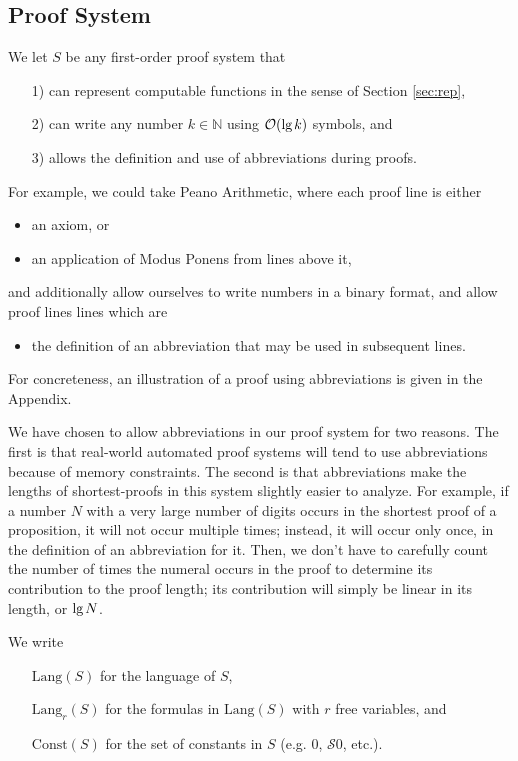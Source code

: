 \documentclass[onecolumn]{miri-tech-article}
\numberwithin{equation}{section}
\theoremstyle{definition}
\newcommand{\NN}{\mathbb{N}}
\newcommand{\Oo}{\mathcal{O}}
\newcommand{\Ss}{\mathcal{S}}
\newcommand{\Lang}{\mathrm{Lang}}
\newcommand{\Const}{\mathrm{Const}}
\renewcommand{\lg}{\mathrm{lg\hspace{0.3ex}}}
\renewcommand{\-}{^{-1}}
\begin{document}
\subsection{Proof System}\label{sec:system}
We let $S$ be any first-order proof system that
\begin{itemize}
\item[1)] can represent computable functions in the sense of Section \ref{sec:rep},
\item[2)] can write any number $k\in\NN$ using $\Oo(\lg k)$ symbols, and 
\item[3)] allows the definition and use of abbreviations during proofs.
\end{itemize}
For example, we could take Peano Arithmetic, where each proof line is either 
\begin{itemize}
\item an axiom, or
\item an application of Modus Ponens from lines above it,
\end{itemize}
and additionally allow ourselves to write numbers in a binary format, and allow proof lines lines which are
\begin{itemize}
\item the definition of an abbreviation that may be used in subsequent lines.
\end{itemize}
For concreteness, an illustration of a proof using abbreviations is given in the Appendix.

\noindent We have chosen to allow abbreviations in our proof system for two reasons.  The first is that real-world automated proof systems will tend to use abbreviations because of memory constraints.  The second is that abbreviations make the lengths of shortest-proofs in this system slightly easier to analyze.  For example, if a number $N$ with a very large number of digits occurs in the shortest proof of a proposition, it will not occur multiple times; instead, it will occur only once, in the definition of an abbreviation for it.  Then, we don't have to carefully count the number of times the numeral occurs in the proof to determine its contribution to the proof length; its contribution will simply be linear in its length, or $\lg N$.

We write 
\begin{itemize}
\item[] $\Lang(S)$ for the language of $S$,
\item[] $\Lang_r(S)$ for the formulas in $\Lang(S)$ with $r$ free variables, and 
\item[] $\Const(S)$ for the set of constants in $S$ (e.g. $0$, $\Ss 0$, etc.).
\end{itemize}
\end{document}

